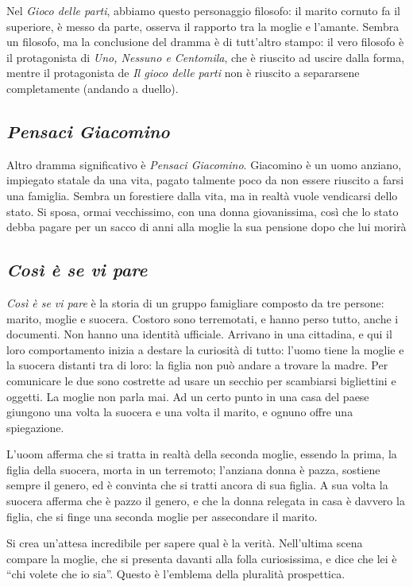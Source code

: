 \documentclass[a4paper, twoside, titlepage]{book}
\newcounter{mar}
\begin{document}
Nel \textit{Gioco delle parti}, abbiamo questo personaggio filosofo: il marito cornuto fa il superiore, è messo da parte, osserva il rapporto tra la moglie e l’amante.
Sembra un filosofo, ma la conclusione del dramma è di tutt’altro stampo: il vero filosofo è il protagonista di \textit{Uno, Nessuno e Centomila}, che è riuscito ad uscire dalla forma, mentre il protagonista de \textit{Il gioco delle parti} non è riuscito a separarsene completamente (andando a duello).

\subsection{\textit{Pensaci Giacomino}}

Altro dramma significativo è \textit{Pensaci Giacomino}.
Giacomino è un uomo anziano, impiegato statale da una vita, pagato talmente poco da non essere riuscito a farsi una famiglia.
Sembra un forestiere dalla vita, ma in realtà vuole vendicarsi dello stato.
Si sposa, ormai vecchissimo, con una donna giovanissima, così che lo stato debba pagare per un sacco di anni alla moglie la sua pensione dopo che lui morirà

\subsection{\textit{Così è se vi pare}}

\textit{Così è se vi pare} è la storia di un gruppo famigliare composto da tre persone: marito, moglie e suocera. Costoro sono terremotati, e hanno perso tutto, anche i documenti. Non hanno una identità ufficiale.
Arrivano in una cittadina, e qui il loro comportamento inizia a destare la curiosità di tutto: l’uomo tiene la moglie e la suocera distanti tra di loro: la figlia non può andare a trovare la madre.
Per comunicare le due sono costrette ad usare un secchio per scambiarsi bigliettini e oggetti.
La moglie non parla mai.
Ad un certo punto in una casa del paese giungono una volta la suocera e una volta il marito, e ognuno offre una spiegazione.

L'uoom afferma che si tratta in realtà della seconda moglie, essendo la prima, la figlia della suocera, morta in un terremoto; l'anziana donna è pazza, sostiene sempre il genero, ed è convinta che si tratti ancora di sua figlia.
A sua volta la suocera afferma che è pazzo il genero, e che la donna relegata in casa è davvero la figlia, che si finge una seconda moglie per assecondare il marito.

Si crea un’attesa incredibile per sapere qual è la verità. Nell’ultima scena compare la moglie, che si presenta davanti alla folla curiosissima, e dice che lei è “chi volete che io sia”.
Questo è l’emblema della pluralità prospettica.
\end{document}
